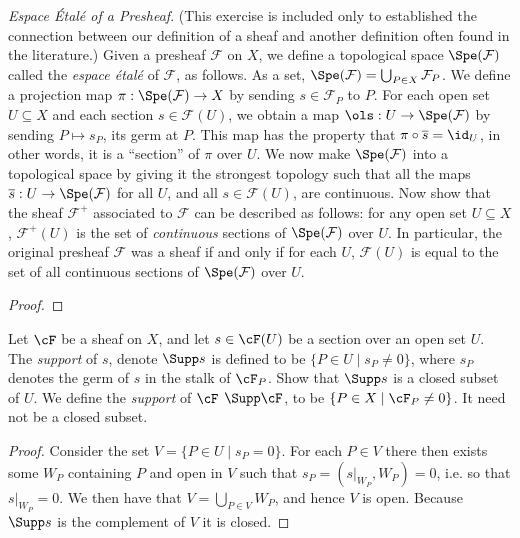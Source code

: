 \begin{problemset}
\item \emph{Espace \'Etal\'e of a Presheaf}. (This exercise is included only to established the connection between our definition of a sheaf and another definition often found in the literature.) Given a presheaf $\mathcal F$ on $X$, we define a topological space $\Spe(\mathcal F)$ called the \emph{espace \'etal\'e} of $\mathcal F$, as follows. As a set, $\Spe(\mathcal F) = \bigcup_{P\in X} \mathcal F_P$. We define a projection map $\pi:\Spe(\mathcal F)\to X$ by sending $s\in \mathcal F_P$ to $P$. For each open set $U\subseteq X$ and each section $s\in \mathcal F(U)$, we obtain a map $\ols : U\to \Spe(\mathcal F)$ by sending $P\mapsto s_P$, its germ at $P$. This map has the property that $\pi\circ \overline s = \id_U$, in other words, it is a ``section'' of $\pi$ over $U$. We now make $\Spe(\mathcal F)$ into a topological space by giving it the strongest topology such that all the maps $\overline s:U\to \Spe(\mathcal F)$ for all $U$, and all $s\in \mathcal F(U)$, are continuous. Now show that the sheaf $\mathcal F^+$ associated to $\mathcal F$ can be described as follows: for any open set $U\subseteq X$, $\mathcal F^+(U)$ is the set of \emph{continuous} sections of $\Spe(\mathcal F)$ over $U$. In particular, the original presheaf $\mathcal F$ was a sheaf if and only if for each $U$, $\mathcal F(U)$ is equal to the set of all continuous sections of $\Spe(\mathcal F)$ over $U$.
	\begin{proof}
		
	\end{proof}

\item Let $\cF$ be a sheaf on $X$, and let $s \in \cF(U)$ be a section over an open set $U$. The \emph{support} of $s$, denote $\Supp s$ is defined to be $\{P \in U \mid s_P \neq 0\}$, where $s_P$ denotes the germ of $s$ in the stalk of $\cF_P$. Show that $\Supp s$ is a closed subset of $U$. We define the \emph{support} of $\cF$ $\Supp \cF$, to be $\{P\in X \mid \cF_P \neq 0\}$. It need not be a closed subset.
	\begin{proof}
		Consider the set $V = \{P \in U \mid s_P = 0\}$. For each $P\in V$ there then exists some $W_P$ containing $P$ and open in $V$ such that $s_P = (s|_{W_P}, W_P) = 0$, i.e. so that $s|_{W_P} = 0$. We then have that $V = \bigcup_{P \in V} W_P$, and hence $V$ is open. Because $\Supp s$ is the complement of $V$ it is closed.


\end{proof}
\end{problemset}
